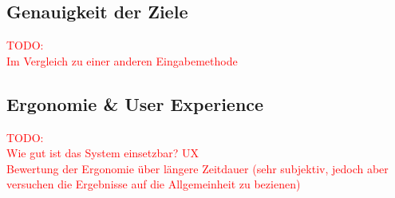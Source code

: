 \subsection{Genauigkeit der Ziele}
\textcolor{red}{TODO:\\
Im Vergleich zu einer anderen Eingabemethode
}


\subsection{Ergonomie \& User Experience}
\textcolor{red}{TODO:\\
Wie gut ist das System einsetzbar? UX\\
Bewertung der Ergonomie über längere Zeitdauer (sehr subjektiv, jedoch aber versuchen die Ergebnisse auf die Allgemeinheit zu bezienen)
}

